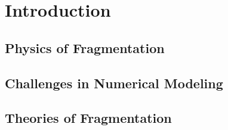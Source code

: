 \setchapterpreamble[u]{\margintoc}
\chapter{Introduction}



\section*{Physics of Fragmentation}




\section*{Challenges in Numerical Modeling}





\section*{Theories of Fragmentation}




